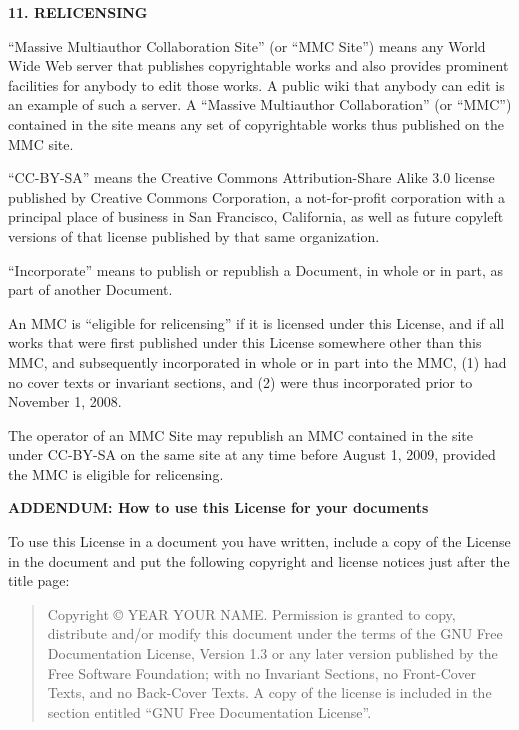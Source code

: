 \documentclass[a4paper]{report}
\begin{document}
\begin{center}
{\Large\bf 11. RELICENSING\par}
{}
\end{center}


``Massive Multiauthor Collaboration Site'' (or ``MMC Site'') means any
World Wide Web server that publishes copyrightable works and also
provides prominent facilities for anybody to edit those works.  A
public wiki that anybody can edit is an example of such a server.  A
``Massive Multiauthor Collaboration'' (or ``MMC'') contained in the
site means any set of copyrightable works thus published on the MMC
site.

``CC-BY-SA'' means the Creative Commons Attribution-Share Alike 3.0
license published by Creative Commons Corporation, a not-for-profit
corporation with a principal place of business in San Francisco,
California, as well as future copyleft versions of that license
published by that same organization.

``Incorporate'' means to publish or republish a Document, in whole or
in part, as part of another Document.

An MMC is ``eligible for relicensing'' if it is licensed under this
License, and if all works that were first published under this License
somewhere other than this MMC, and subsequently incorporated in whole
or in part into the MMC, (1) had no cover texts or invariant sections,
and (2) were thus incorporated prior to November 1, 2008.

The operator of an MMC Site may republish an MMC contained in the site
under CC-BY-SA on the same site at any time before August 1, 2009,
provided the MMC is eligible for relicensing.


\begin{center}
{\Large\bf ADDENDUM: How to use this License for your documents\par}
{}
\end{center}

To use this License in a document you have written, include a copy of
the License in the document and put the following copyright and
license notices just after the title page:

\bigskip
\begin{quote}
    Copyright \copyright{}  YEAR  YOUR NAME.
    Permission is granted to copy, distribute and/or modify this document
    under the terms of the GNU Free Documentation License, Version 1.3
    or any later version published by the Free Software Foundation;
    with no Invariant Sections, no Front-Cover Texts, and no Back-Cover Texts.
    A copy of the license is included in the section entitled ``GNU
    Free Documentation License''.
\end{quote}
\bigskip
    
\end{document}
